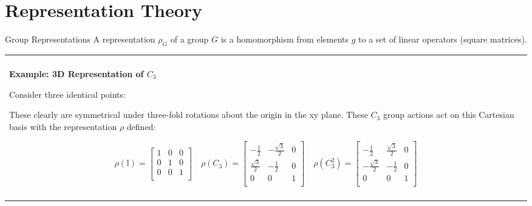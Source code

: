 \documentclass[11pt]{beamer}
\newenvironment{boxed2}
    {\begin{center}
    \begin{tabular}{|p{0.95\textwidth}|}
    \hline\\
    }
    { 
    \\\\\hline
    \end{tabular} 
    \end{center}
    }
\begin{document}
\section{Representation Theory}
\begin{frame}{Group Representations}
	A representation $\rho_G$ of a group $G$ is a homomorphism from elements $g$ to a set of linear operators (square matrices). 
	
	\vspace{0.25cm}\small
	
		\begin{boxed2}
		
		\vspace{-.5cm}
		
		\textbf{Example: 3D Representation of $C_3$}
		
		Consider three identical points:
		
		These clearly are symmetrical under three-fold rotations about the origin in the xy plane. These $C_3$ group actions act on this Cartesian basis with the representation $\rho$ defined:\tiny
		
		$$
		\rho(\mathbb{I}) = \begin{bmatrix}
			1&0&0\\
			0&1&0\\
			0&0&1\\
		\end{bmatrix}\quad 		\rho(C_3) = \begin{bmatrix}
		-\frac{1}{2}&-\frac{\sqrt{3}}{2}&0\\
		\frac{\sqrt{3}}{2}&-\frac{1}{2}&0\\
		0&0&1\\
		\end{bmatrix}\quad 
		\rho(C_3^2) = \begin{bmatrix}
		-\frac{1}{2}&\frac{\sqrt{3}}{2}&0\\
		-\frac{\sqrt{3}}{2}&-\frac{1}{2}&0\\
		0&0&1\\
		\end{bmatrix}
		$$
	\end{boxed2}
\end{frame}
\end{document}
